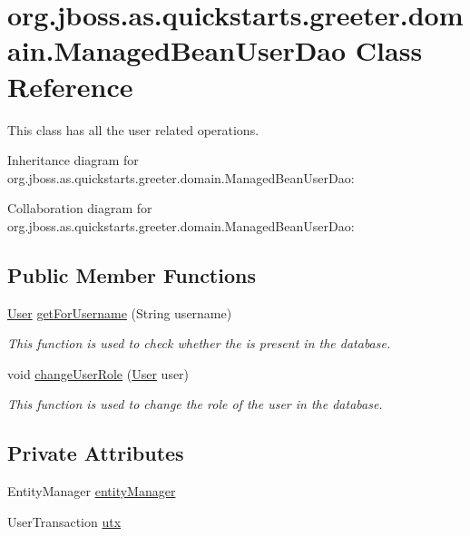 \hypertarget{classorg_1_1jboss_1_1as_1_1quickstarts_1_1greeter_1_1domain_1_1_managed_bean_user_dao}{}\section{org.\+jboss.\+as.\+quickstarts.\+greeter.\+domain.\+Managed\+Bean\+User\+Dao Class Reference}
\label{classorg_1_1jboss_1_1as_1_1quickstarts_1_1greeter_1_1domain_1_1_managed_bean_user_dao}


This class has all the user related operations.  




Inheritance diagram for org.\+jboss.\+as.\+quickstarts.\+greeter.\+domain.\+Managed\+Bean\+User\+Dao\+:


Collaboration diagram for org.\+jboss.\+as.\+quickstarts.\+greeter.\+domain.\+Managed\+Bean\+User\+Dao\+:
\subsection*{Public Member Functions}
\begin{DoxyCompactItemize}
\item 
\hyperlink{classorg_1_1jboss_1_1as_1_1quickstarts_1_1greeter_1_1domain_1_1_user}{User} \hyperlink{classorg_1_1jboss_1_1as_1_1quickstarts_1_1greeter_1_1domain_1_1_managed_bean_user_dao_a08dba1ba03f3df2bf92d45532b523e65}{get\+For\+Username} (String username)
\begin{DoxyCompactList}\small\item\em This function is used to check whether the is present in the database. \end{DoxyCompactList}\item 
void \hyperlink{classorg_1_1jboss_1_1as_1_1quickstarts_1_1greeter_1_1domain_1_1_managed_bean_user_dao_aefa42ba41f80108e41cdcb5cfb53520f}{change\+User\+Role} (\hyperlink{classorg_1_1jboss_1_1as_1_1quickstarts_1_1greeter_1_1domain_1_1_user}{User} user)
\begin{DoxyCompactList}\small\item\em This function is used to change the role of the user in the database. \end{DoxyCompactList}\end{DoxyCompactItemize}
\subsection*{Private Attributes}
\begin{DoxyCompactItemize}
\item 
Entity\+Manager \hyperlink{classorg_1_1jboss_1_1as_1_1quickstarts_1_1greeter_1_1domain_1_1_managed_bean_user_dao_a6a35d48b96252f74ec50e9708ddfe2bb}{entity\+Manager}
\item 
User\+Transaction \hyperlink{classorg_1_1jboss_1_1as_1_1quickstarts_1_1greeter_1_1domain_1_1_managed_bean_user_dao_a327af0fd29d3e88695e0a497fecd7ffc}{utx}
\end{DoxyCompactItemize}


